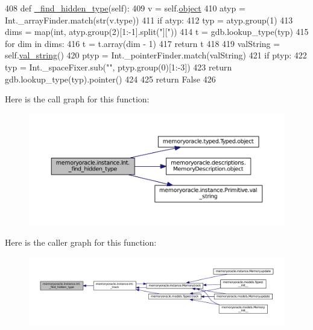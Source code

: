 \begin{DoxyCode}
408     \textcolor{keyword}{def }\hyperlink{classmemoryoracle_1_1instance_1_1Int_a450a73bc8aaf1a7ac5f18c3ed1a933fc}{\_find\_hidden\_type}(self):
409         v = self.\hyperlink{classmemoryoracle_1_1typed_1_1Typed_a0d1a3c7644d37da66f9ea5cb269115fe}{object}
410         atyp = Int.\_arrayFinder.match(str(v.type))
411         \textcolor{keywordflow}{if} atyp:
412             typ = atyp.group(1)
413             dims = map(int, atyp.group(2)[1:-1].split(\textcolor{stringliteral}{"]["}))
414             t = gdb.lookup\_type(typ)
415             \textcolor{keywordflow}{for} dim \textcolor{keywordflow}{in} dims:
416                 t = t.array(dim - 1)
417             \textcolor{keywordflow}{return} t
418 
419         valString = self.\hyperlink{classmemoryoracle_1_1instance_1_1Primitive_abc513cbf3d0938c0db133e9af0a6f5ea}{val\_string}()
420         ptyp = Int.\_pointerFinder.match(valString)
421         \textcolor{keywordflow}{if} ptyp:
422             typ = Int.\_spaceFixer.sub(\textcolor{stringliteral}{""}, ptyp.group(0)[1:-3])
423             \textcolor{keywordflow}{return} gdb.lookup\_type(typ).pointer()
424 
425         \textcolor{keywordflow}{return} \textcolor{keyword}{False}
426 
\end{DoxyCode}


Here is the call graph for this function\+:
\nopagebreak
\begin{figure}[H]
\begin{center}
\leavevmode
\includegraphics[width=350pt]{classmemoryoracle_1_1instance_1_1Int_a450a73bc8aaf1a7ac5f18c3ed1a933fc_cgraph}
\end{center}
\end{figure}




Here is the caller graph for this function\+:
\nopagebreak
\begin{figure}[H]
\begin{center}
\leavevmode
\includegraphics[width=350pt]{classmemoryoracle_1_1instance_1_1Int_a450a73bc8aaf1a7ac5f18c3ed1a933fc_icgraph}
\end{center}
\end{figure}


